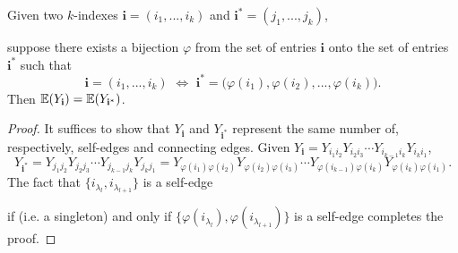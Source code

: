 \begin{lemma}
  \label{lem:equal_equiv_class_equal_expectation}
  \notready

  Given two $k$-indexes $\mathbf{i} = (i_1,...,i_k)$ and $\mathbf{i}^* = (j_1,...,j_k)$, 

  suppose there exists a bijection $\varphi$ from the set of entries $\mathbf{i}$ onto the set of entries $\mathbf{i}^*$ such that
  \[
  \mathbf{i} = (i_1,...,i_k) \,\, \Longleftrightarrow \,\, \mathbf{i}^* = \bigl( \varphi(i_1),\varphi(i_2),...,\varphi(i_k) \bigl).
  \]
  Then $\mathbb{E} (Y_\mathbf{i}) = \mathbb{E} (Y_{\mathbf{i}^*})$.
\end{lemma}
\begin{proof}
  It suffices to show that $Y_\mathbf{i}$ and $Y_{\mathbf{i}^*}$ represent the same number of, respectively, self-edges and connecting edges.
  Given $Y_\mathbf{i} = Y_{i_1 i_2}Y_{i_2 i_3} \cdots Y_{i_{k-1} i_k}Y_{i_k i_1}$,
  $$
  Y_{\mathbf{i}^*} = Y_{j_1 j_2}Y_{j_2 j_3} \cdots Y_{j_{k-1} j_k}Y_{j_k j_1} 
  = Y_{\varphi(i_1) \varphi(i_2)}Y_{\varphi(i_2) \varphi(i_3)} \cdots Y_{\varphi(i_{k-1}) \varphi(i_k)}Y_{\varphi(i_k) \varphi(i_1)}.
  $$
  The fact that $\{ i_{\lambda_l},i_{\lambda_{l+1}} \}$ is a self-edge 

  if (i.e. a singleton) and only if $\{ \varphi(i_{\lambda_l}),\varphi(i_{\lambda_{l+1}}) \}$ is a self-edge completes the proof.
\end{proof}



